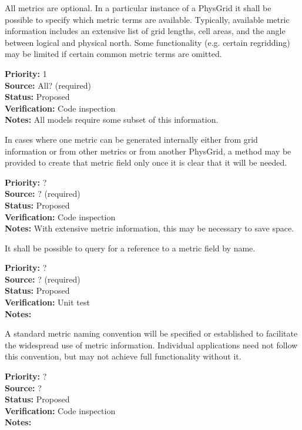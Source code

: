 All metrics are optional.  In a particular instance of a PhysGrid it shall be
possible to specify which metric terms are available.  Typically, available
metric information includes an extensive list of grid lengths, cell areas, and
the angle between logical and physical north.  Some functionality (e.g. certain
regridding) may be limited if certain common metric terms are omitted.
\begin{reqlist}
{\bf Priority:} 1 \\
{\bf Source:} All? (required) \\
{\bf Status:} Proposed \\
{\bf Verification:} Code inspection \\
{\bf Notes:} All models require some subset of this information.
\end{reqlist}

In cases where one metric can be generated internally either from grid information
or from other metrics or from another PhysGrid, a method may be provided to create
that metric field only once it is clear that it will be needed.
\begin{reqlist}
{\bf Priority:} ? \\
{\bf Source:} ? (required) \\
{\bf Status:} Proposed \\
{\bf Verification:} Code inspection \\
{\bf Notes:} With extensive metric information, this may be necessary to save space.
\end{reqlist}

It shall be possible to query for a reference to a metric field by name.
\begin{reqlist}
{\bf Priority:} ? \\
{\bf Source:} ? (required) \\
{\bf Status:} Proposed \\
{\bf Verification:} Unit test \\
{\bf Notes:} 
\end{reqlist}

A standard metric naming convention will be specified or established to facilitate
the widespread use of metric information.  Individual applications need not
follow this convention, but may not achieve full functionality without it.
\begin{reqlist}
{\bf Priority:} ? \\
{\bf Source:} ? \\
{\bf Status:} Proposed \\
{\bf Verification:} Code inspection \\
{\bf Notes:} 
\end{reqlist}


